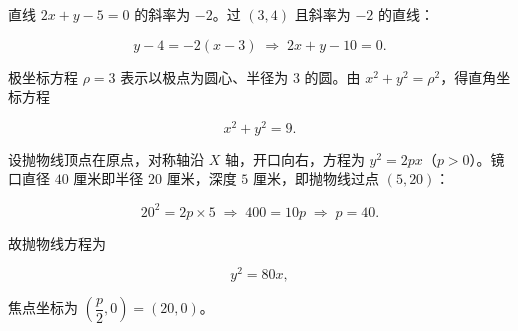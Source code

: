 \begin{answer}

直线 $2x+y-5=0$ 的斜率为 $-2$。过 $(3,4)$ 且斜率为 $-2$ 的直线：

\nopagebreak[4]
\[
y-4=-2(x-3)
\;\Longrightarrow\;
2x+y-10=0.
\]


极坐标方程 $\rho=3$ 表示以极点为圆心、半径为 $3$ 的圆。由 $x^2+y^2=\rho^2$，得直角坐标方程

\nopagebreak[4]
\[
x^2+y^2=9.
\]


设抛物线顶点在原点，对称轴沿 $X$ 轴，开口向右，方程为 $y^2=2px$（$p>0$）。镜口直径 $40$ 厘米即半径 $20$ 厘米，深度 $5$ 厘米，即抛物线过点 $(5,20)$：

\nopagebreak[4]
\[
20^2=2p\times5
\;\Longrightarrow\;
400=10p
\;\Longrightarrow\;
p=40.
\]

故抛物线方程为

\nopagebreak[4]
\[
y^2=80x,
\]

焦点坐标为 $\left(\dfrac p2,0\right)=(20,0)$。
\nopagebreak[4]
\begin{center}\end{center}
\nopagebreak[4]












\end{answer}
